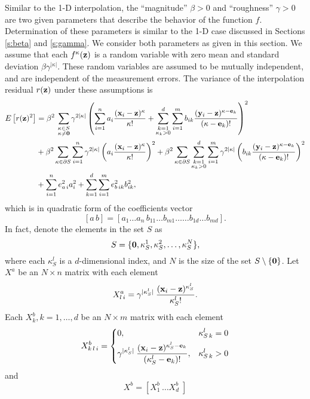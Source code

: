 Similar to the 1-D interpolation, the ``magnitude'' $\beta > 0$ and
``roughness'' $\gamma > 0$ are two given parameters that describe the behavior
of the function $f$.  Determination of these parameters is similar to
the 1-D case discussed in Sections \ref{s:beta} and \ref{s:gamma}.
We consider both
parameters as given in this section.  We assume that each $f^{\kappa}(\mathbf{z})$
is a random variable with zero mean and standard deviation
$\beta\gamma^{|\kappa|}$.  These random variables are assumed to be mutually
independent, and are independent of the measurement errors.  The variance
of the interpolation residual $r(\mathbf{z})$ under these assumptions is
\[\begin{split}
   E\left[r(\mathbf{z})^2\right]
&= \beta^2\: \sum_{\substack{\kappa\in S\\ \kappa\ne\mathbf{0}}} \gamma^{2|\kappa|}
   \left(\sum_{i=1}^n a_i \frac{(\mathbf{x}_i-\mathbf{z})^\kappa}{\kappa!}
       + \sum_{\substack{k=1\\ \kappa_k>0}}^d \sum_{i=1}^m b_{ik}
         \frac{(\mathbf{y}_i-\mathbf{z})^{\kappa-\mathbf{e}_k}}{(\kappa-\mathbf{e}_k)!} \right)^2 \\
&+ \beta^2 \sum_{\kappa\in \partial S} \sum_{i=1}^n
   \gamma^{2|\kappa|} \left( a_i \frac{(\mathbf{x}_i-\mathbf{z})^\kappa}{\kappa!} \right)^2
 + \beta^2 \sum_{\kappa\in \partial S}
   \sum_{\substack{k=1\\ \kappa_k>0}}^d \sum_{i=1}^m \gamma^{2|\kappa|}
   \left( b_{ik} \frac{(\mathbf{y}_i-\mathbf{z})^{\kappa-\mathbf{e}_k}}{(\kappa-\mathbf{e}_k)!} \right)^2 \\
&+ \sum_{i=1}^n e_{a\,i}^2 a_i^2
 + \sum_{k=1}^d \sum_{i=1}^m  e_{b\,ik}^2 b_{ik}^2 ,
\end{split}\]
which is in quadratic form of the coefficients vector
\[ [a\,b] = [a_1\ldots a_n\,
             b_{11}\ldots b_{m1}\ldots\ldots b_{1d}\ldots b_{md}] .\]
In fact, denote the elements in the set $S$ as
\[ S = \{ \mathbf{0}, \kappa_S^1, \kappa_S^2, \ldots, \kappa_S^N \} ,\]
where each $\kappa_S^l$ is a $d$-dimensional index, and $N$ is the size of the
set $S\setminus\{\mathbf{0}\}$.  Let $X^a$ be an $N \times n$ matrix with each element
\[ X^a_{l\,i} = \gamma^{|\kappa_S^l|} \:
                 \frac{(\mathbf{x}_i-\mathbf{z})^{\kappa_S^l}}{\kappa_S^l!} . \]
Each $X^b_k, k=1,\ldots,d$ be an $N \times m$ matrix with each element
\[ X^b_{k\,l\,i} = \left\{ \begin{aligned}
   & 0, && \kappa^l_{S\,k} = 0 \\
   & \gamma^{|\kappa_S^l|} \:
     \frac{(\mathbf{x}_i-\mathbf{z})^{\kappa_S^l-\mathbf{e}_k}}{(\kappa_S^l-\mathbf{e}_k)!},
   && \kappa^l_{S\,k} > 0
\end{aligned} \right. \]
and \[ X^b = \left[ X^b_1\, \ldots X^b_d \; \right] \]
